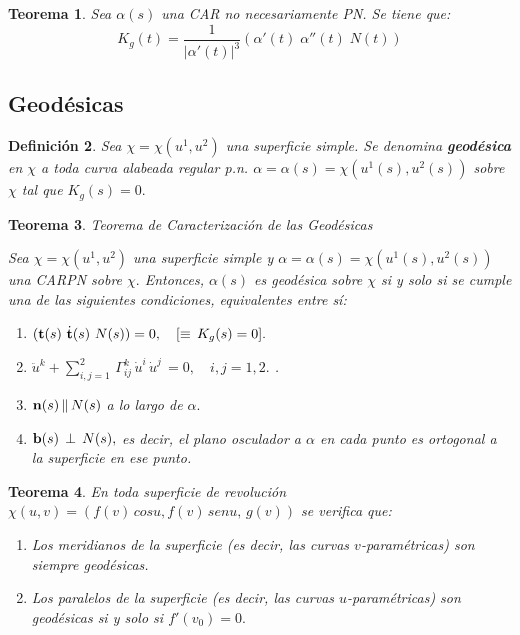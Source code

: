 \documentclass[twoside]{article}
\newtheorem{theorem}{Teorema}[section]
\newtheorem{defi}[theorem]{Definición}
\numberwithin{equation}{section}
\begin{document}
\begin{theorem} Sea $\alpha(s)$ una CAR no necesariamente PN. Se tiene que:
\[
K_g(t)=\frac{1}{|\alpha'(t)|^3}(\alpha'(t)\; \alpha''(t)\; N(t))
\]
\end{theorem}
\subsection{Geodésicas}

\begin{defi}
Sea $\chi = \chi(u^1, u^2)$ una superficie simple. Se denomina \textbf{geodésica} en $\chi$ a toda curva alabeada regular p.n. $\alpha = \alpha(s) = \chi(u^1(s), u^2(s))$ sobre $\chi$ tal que $K_g(s) = 0.$
\end{defi}

\begin{theorem} {\em Teorema de Caracterización de las Geodésicas}

Sea $\chi = \chi(u^1, u^2)$ una superficie simple y $\alpha = \alpha(s) = \chi(u^1(s), u^2(s))$ una CARPN sobre $\chi.$ Entonces, $\alpha(s)$ es geodésica sobre $\chi$ si y solo si se cumple una de las siguientes condiciones, equivalentes entre sí:

\begin{enumerate}
\item[C1] \quad $({\bf t}(s) \,\, \dot{{\bf t}}(s) \,\, N(s)) = 0, \quad [\equiv \, K_g(s) = 0].$
\item[C2] \quad $\ddot{u}^k + \sum_{i, j = 1}^2 \, \Gamma_{ij}^k \, \dot{u}^i \, \dot{u}^j \, = 0, \quad i,j = 1,2.$ .
\item[C3] \quad ${\bf n}(s) \, \| \, N(s)$ a lo largo de $\alpha.$
\item[C4] \quad ${\bf b}(s) \, \perp \, N(s),$ es decir, el plano osculador a $\alpha$ en cada punto es ortogonal a la superficie en ese \quad punto.
\end{enumerate}
\end{theorem}



\begin{theorem}

En toda superficie de revolución $\chi(u,v) = (f(v) \, cos u, f(v) \, sen u, \, g(v))$ se verifica que:
\begin{enumerate}
\item Los meridianos de la superficie (es decir, las curvas $v$-paramétricas) son siempre geodésicas.
\item Los paralelos de la superficie (es decir, las curvas $u$-paramétricas) son geodésicas si y solo si $f'(v_0) = 0.$
\end{enumerate}
\end{theorem}
\end{document}
